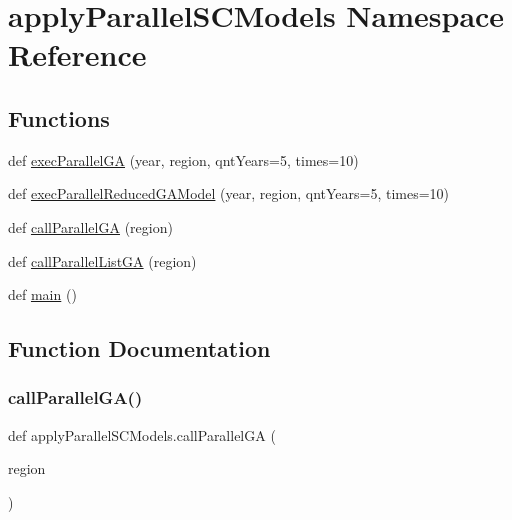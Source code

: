 \hypertarget{namespaceapply_parallel_s_c_models}{}\section{apply\+Parallel\+S\+C\+Models Namespace Reference}
\label{namespaceapply_parallel_s_c_models}
\subsection*{Functions}
\begin{DoxyCompactItemize}
\item 
def \hyperlink{namespaceapply_parallel_s_c_models_aac9a059787ef56095eeb73cbdfc76293}{exec\+Parallel\+GA} (year, region, qnt\+Years=5, times=10)
\item 
def \hyperlink{namespaceapply_parallel_s_c_models_a3a10fdef3927dc7dfb2abe7b2e828dcb}{exec\+Parallel\+Reduced\+G\+A\+Model} (year, region, qnt\+Years=5, times=10)
\item 
def \hyperlink{namespaceapply_parallel_s_c_models_a12636abc0193cc3c2ad7c7f88f9d86d4}{call\+Parallel\+GA} (region)
\item 
def \hyperlink{namespaceapply_parallel_s_c_models_afb8acc8d78df198e7e3b9b386f409df3}{call\+Parallel\+List\+GA} (region)
\item 
def \hyperlink{namespaceapply_parallel_s_c_models_a6b92e21fbbbe7d88257c677e030865f7}{main} ()
\end{DoxyCompactItemize}


\subsection{Function Documentation}
\mbox{\label{namespaceapply_parallel_s_c_models_a12636abc0193cc3c2ad7c7f88f9d86d4}} 
\subsubsection{\texorpdfstring{call\+Parallel\+G\+A()}{callParallelGA()}}
{\footnotesize\ttfamily def apply\+Parallel\+S\+C\+Models.\+call\+Parallel\+GA (\begin{DoxyParamCaption}\item[{}]{region }\end{DoxyParamCaption})}

